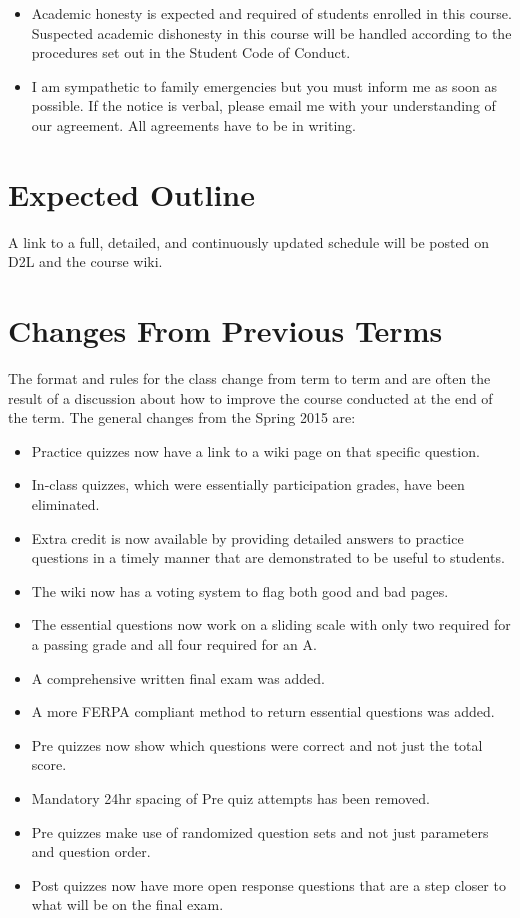 \documentclass[letterpaper,10pt]{article}
\begin{document}
\begin{itemize}
\item Academic honesty is expected and required of students enrolled
  in this course.  Suspected academic dishonesty in this course will
  be handled according to the procedures set out in the Student Code
  of Conduct.

\item I am sympathetic to family emergencies but you must inform me as
  soon as possible. If the notice is verbal, please email me with your
  understanding of our agreement. All agreements have to be in
  writing.


\end{itemize}


\section{Expected Outline}
A link to a full, detailed, and continuously updated schedule will be
posted on D2L and the course wiki.


\section{Changes From Previous Terms}
The format and rules for the class change from term to term and are often the result of a discussion about how to improve the course conducted at the end of the term. The general changes from the Spring 2015 are:

\begin{itemize}
    \item Practice quizzes now have a link to a wiki page on that specific question.
    \item In-class quizzes, which were essentially participation grades, have been eliminated.
    \item Extra credit is now available by providing detailed answers to practice questions in a timely manner that are demonstrated to be useful to students.
    \item The wiki now has a voting system to flag both good and bad pages.
    \item The essential questions now work on a sliding scale with only two required for a passing grade and all four required for an A.
    \item A comprehensive written final exam was added.
    \item A more FERPA compliant method to return essential questions was added.
    \item Pre quizzes now show which questions were correct and not just the total score.
    \item Mandatory 24hr spacing of Pre quiz attempts has been removed.
    \item Pre quizzes make use of randomized question sets and not just parameters and question order.
    \item Post quizzes now have more open response questions that are a step closer to what will be on the final exam.
\end{itemize}
\end{document}
